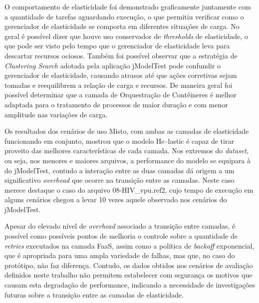 \documentclass[english,brazilian]{UNISINOSmonografia} %
\begin{document}
O comportamento de elasticidade foi demonstrado graficamente juntamente com a quantidade de tarefas aguardando execução, o que permitiu verificar como o gerenciador de elasticidade se comporta em diferentes situações de carga.
%
No geral é possível dizer que houve uso conservador de \textit{thresholds} de elasticidade, o que pode ser visto pelo tempo que o gerenciador de elasticidade leva para descartar recursos ociosos.
%
Também foi possível observar que a estratégia de \textit{Clustering Search} adotada pela aplicação jModelTest pode confundir o gerenciador de elasticidade, causando atrasos até que ações corretivas sejam tomadas e reequilibrem a relação de carga e recursos.
%
De maneira geral foi possível determinar que a camada de Orquestração de Contêineres é melhor adaptada para o tratamento de processos de maior duração e com menor amplitude nas variações de carga.



Os resultados dos cenários de uso Misto, com ambas as camadas de elasticidade funcionando em conjunto, mostrou que o modelo \textsf{He}--lastic é capaz de tirar proveito das melhores características de cada camada.
%
Nos extremos do \textit{dataset}, ou seja, nos menores e maiores arquivos, a performance do modelo se equipara à do jModelTest, contudo a interação entre as duas camadas dá origem a um significativo \textit{overhead} que ocorre na transição entre as camadas.
%
Neste caso merece destaque o caso do arquivo 08-HIV\_vpu.ref2, cujo tempo de execução em alguns cenários chegou a levar 10 vezes aquele observado nos cenários do jModelTest.


Apesar do elevado nível de \textit{overhead} associado a transição entre camadas, é possível como possíveis pontos de melhoria o controle sobre a quantidade de \textit{retries} executados na camada FaaS, assim como a política de \textit{backoff} exponencial, que é apropriada para uma ampla variedade de falhas, mas que, no caso do protótipo, não faz diferença.
%
Contudo, os dados obtidos nos cenários de avaliação definidos neste trabalho não permitem estabelecer com segurança os motivos que causam esta degradação de performance, indicando a necessidade de investigações futuras sobre a transição entre as camadas de elasticidade.


\end{document}
